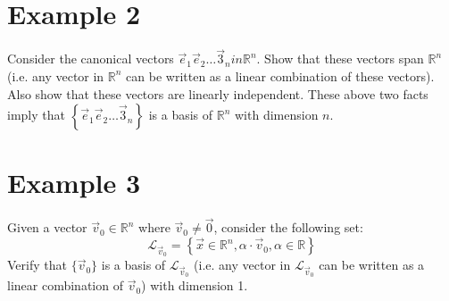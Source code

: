 \section{\small Example 2}
Consider the canonical vectors $\vec{e}_1 \vec{e}_2 \ldots \vec{3}_n in
	\mathbb{R}^n$. Show that these vectors span $\mathbb{R}^n$ (i.e. any vector in
$\mathbb{R}^n$ can be written as a linear combination of these vectors). Also
show that these vectors are linearly independent. These above two facts imply
that $\left\{ \vec{e}_1 \vec{e}_2 \ldots \vec{3}_n \right\}$ is a basis of
$\mathbb{R}^n$ with dimension $n$.

\section{\small Example 3}
Given a vector $\vec{v}_0 \in \mathbb{R}^n$ where $\vec{v}_0 \neq \vec{0}$,
consider the following set:
\[
	\mathcal{L}_{\vec{v}_0} = \left\{
	\vec{x} \in \mathbb{R}^n,
	\alpha \cdot \vec{v}_0, \alpha \in \mathbb{R}
	\right\}
\]
Verify that $\{\vec{v}_0\}$ is a basis of $\mathcal{L}_{\vec{v}_0}$ (i.e. any
vector in $\mathcal{L}_{\vec{v}_0}$ can be written as a linear combination of
$\vec{v}_0$) with dimension 1.
